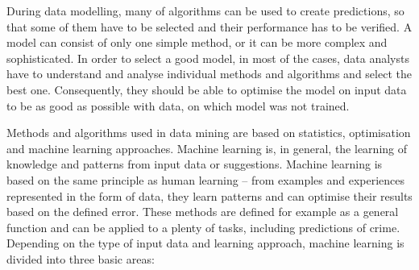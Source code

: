 \documentclass[thesis=M,english]{FITthesis}[2012/10/20]
\begin{document}
During data modelling, many of algorithms can be used to create predictions, so that some of them have to be selected and their performance has to be verified. A model can consist of only one simple method, or it can be more complex and sophisticated. In order to select a good model, in most of the cases, data analysts have to understand and analyse individual methods and algorithms and select the best one. Consequently, they should be able to optimise the model on input data to be as good as possible with data, on which model was not trained. 

Methods and algorithms used in data mining are based on statistics, optimisation and machine learning approaches. Machine learning is, in general, the learning of knowledge and patterns from input data or suggestions. Machine learning is based on the same principle as human learning -- from examples and experiences represented in the form of data, they learn patterns and can optimise their results based on the defined error. These methods are defined for example as a general function and can be applied to a plenty of tasks, including predictions of crime. Depending on the type of input data and learning approach, machine learning is divided into three basic areas: 
\end{document}
